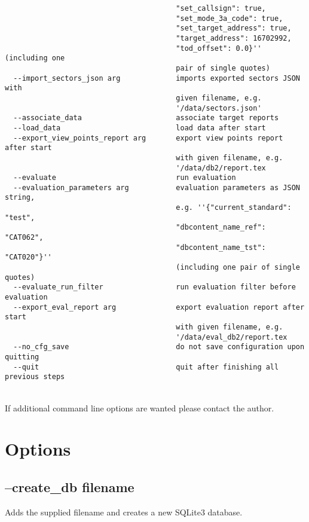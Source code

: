 \begin{lstlisting}
                                        "set_callsign": true, 
                                        "set_mode_3a_code": true, 
                                        "set_target_address": true, 
                                        "target_address": 16702992, 
                                        "tod_offset": 0.0}'' (including one 
                                        pair of single quotes)
  --import_sectors_json arg             imports exported sectors JSON with 
                                        given filename, e.g. 
                                        '/data/sectors.json'
  --associate_data                      associate target reports
  --load_data                           load data after start
  --export_view_points_report arg       export view points report after start 
                                        with given filename, e.g. 
                                        '/data/db2/report.tex
  --evaluate                            run evaluation
  --evaluation_parameters arg           evaluation parameters as JSON string, 
                                        e.g. ''{"current_standard": "test", 
                                        "dbcontent_name_ref": "CAT062", 
                                        "dbcontent_name_tst": "CAT020"}'' 
                                        (including one pair of single quotes)
  --evaluate_run_filter                 run evaluation filter before evaluation
  --export_eval_report arg              export evaluation report after start 
                                        with given filename, e.g. 
                                        '/data/eval_db2/report.tex
  --no_cfg_save                         do not save configuration upon quitting
  --quit                                quit after finishing all previous steps
\end{lstlisting}
\ \\

If additional command line options are wanted please contact the author.

\section{Options}

\subsection{--create\_db filename}

Adds the supplied filename and creates a new SQLite3 database.
 
